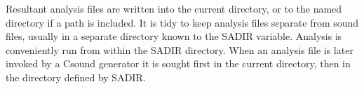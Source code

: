   Resultant analysis files are written into the current directory, or to the named directory if a path is included. It is tidy to keep analysis files separate from sound files, usually in a separate directory known to the SADIR variable. Analysis is conveniently run from within the SADIR directory. When an analysis file is later invoked by a Csound generator it is sought first in the current directory, then in the directory defined by SADIR. 


\begin{comment}
\begin{tabular}{lcr}
Previous &Home &Next \\
GEN42 &Up &Soundfile Formats.

\end{tabular}



\end{comment}
